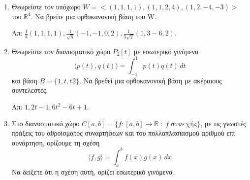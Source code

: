 \documentclass[a4paper,table]{report}
\begin{document}
\begin{enumerate}
  \item Θεωρείστε τον υπόχωρο $ W = < (1,1,1,1), (1,1,2,4), (1,2,-4,-3)> $ του 
    $ \mathbb{R}^{4} $. Να βρείτε μια ορθοκανονική βάση του W.

    \hfill Απ: $ \frac{1}{2} (1,1,1,1), \frac{1}{\sqrt{6}} (-1,-1,0,2) , \frac{1}{5
    \sqrt{2}} (1,3-6,2) $.

  \item Θεωρείστε τον διανυσματικό χώρο $ P_{2}[t] $ με εσωτερικό γινόμενο 
    \[
      \langle p(t), q(t)\rangle = \int _{-1}^{1}p(t)q(t) \,{dt} 
    \] 
    και βάση $ B = \{ 1,t,t^{}2 \} $. Να βρεθεί μια ορθοκανονική βάση με ακέραιους
    συντελεστές.

    \hfill Απ: $ 1, 2t-1, 6t^{2}-6t+1 $. 

  \item Στο διανυσματικό χώρο $ C[a,b] = \{ f \colon [a,b] \to \mathbb{R} \; : \; f
    \; \text{συνεχής} \} $, με τις γνωστές πράξεις του αθροίσματος συναρτήσεων και του
    πολλαπλασιασμού αριθμού επί συνάρτηση, ορίζουμε τη σχέση 
    \[
      \langle f, g\rangle = \int _{a}^{b} f(x)g(x) \,{dx} 
    \] 
    Να δείξετε ότι η σχέση αυτή, ορίζει εσωτερικό γινόμενο.

\end{enumerate}
\end{document}
